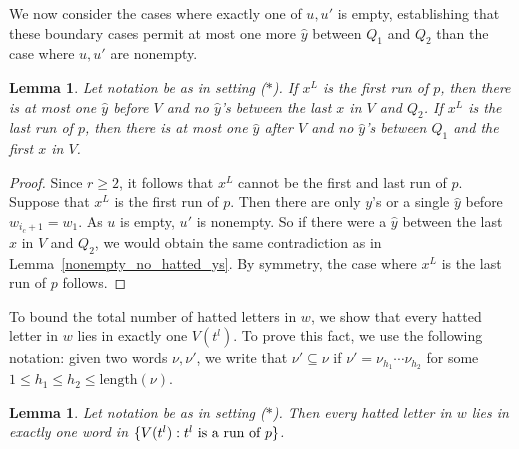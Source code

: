 \documentclass[11pt]{amsart}
\newtheorem{lemma}[theorem]{Lemma}
\newcommand{\settingstar}{{\normalfont(\hyperref[setting_star]{$\ast$})}}
\newcommand{\hatted}[1]{\widehat{#1}}
\begin{document}
We now consider the cases where exactly one of $u,u'$ is empty, establishing that these boundary cases permit at most one more $\hatted{y}$ between $Q_1$ and $Q_2$ than the case where $u,u'$ are nonempty.

\begin{lemma}\label{empty_cases}
     Let notation be as in setting \settingstar. If $x^L$ is the first run of $p$, then there is at most one $\hatted{y}$ before $V$ and no $\hatted{y}$'s between the last $x$ in $V$ and $Q_2$. If $x^L$ is the last run of $p$, then there is at most one $\hatted{y}$ after $V$ and no $\hatted{y}$'s between $Q_1$ and the first $x$ in $V$.
\end{lemma}

\begin{proof}
    Since $r\geq2$, it follows that $x^L$ cannot be the first and last run of $p$. Suppose that $x^L$ is the first run of $p$. Then there are only $y$'s or a single $\hatted{y}$ before $w_{i_c+1}=w_1$. As $u$ is empty, $u'$ is nonempty. So if there were a $\hatted{y}$ between the last $x$ in $V$ and $Q_2$, we would obtain the same contradiction as in Lemma~\ref{nonempty_no_hatted_ys}. By symmetry, the case where $x^L$ is the last run of $p$ follows.
\end{proof}

To bound the total number of hatted letters in $w$, we show that every hatted letter in $w$ lies in exactly one $V(t^l)$. To prove this fact, we use the following notation: given two words $\nu,\nu'$, we write that $\nu'\subseteq \nu$ if $\nu'=\nu_{h_1}\cdots\nu_{h_2}$ for some $1\leq h_1\leq h_2\leq\text{length}(\nu)$.

\begin{lemma}\label{exactly_one_Q_1_Q_2_pair}
    Let notation be as in setting \settingstar. Then every hatted letter in $w$ lies in exactly one word in $\{V(t^l): t^l\text{\normalfont~is~a~run~of~}p\}$.
\end{lemma}
\end{document}
